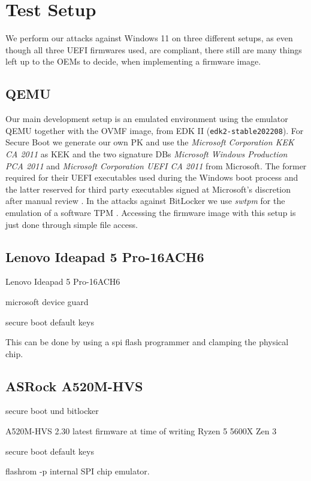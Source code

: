 
\chapter{Test Setup}
\label{sec:test-setup}

We perform our attacks against Windows 11 on three different setups, as even though all three \ac{UEFI} firmwares used, are \cite{pi-spec} compliant, there still are many things left up to the \acp{OEM} to decide, when implementing a firmware image.

\section{\acs{QEMU}}
\label{sec:test-setup:qemu}

Our main development setup is an emulated environment using the emulator \ac{QEMU}\cite{qemu} together with the \ac{OVMF} image, from \ac{EDK} II (\lstinline{edk2-stable202208}).
For Secure Boot we generate our own \ac{PK} and use the \emph{Microsoft Corporation \acs{KEK} \acs{CA} 2011} as \ac{KEK} and the two signature \acp{DB} \emph{Microsoft Windows Production PCA 2011} and \emph{Microsoft Corporation UEFI CA 2011} from Microsoft. The former required for their \ac{UEFI} executables used during the Windows boot process \cite{microsoft-secure-boot-guidance} and the latter reserved for third party executables signed at Microsoft's discretion after manual review \cite{microsoft-uefi-signing}.
In the attacks against BitLocker we use \emph{swtpm} for the emulation of a software \ac{TPM} \cite{swtpm}. Accessing the firmware image with this setup is just done through simple file access.

\section{Lenovo Ideapad 5 Pro-16ACH6}
\label{sec:test-setup:lenovo}

Lenovo Ideapad 5 Pro-16ACH6


microsoft device guard

secure boot default keys


This can be done by using a spi flash programmer and clamping the physical chip. 

\section{ASRock A520M-HVS}
\label{sec:test-setup:asrock}



secure boot und bitlocker


A520M-HVS 2.30 latest firmware at time of writing
Ryzen 5 5600X Zen 3

secure boot default keys


flashrom -p internal
SPI chip emulator. 

